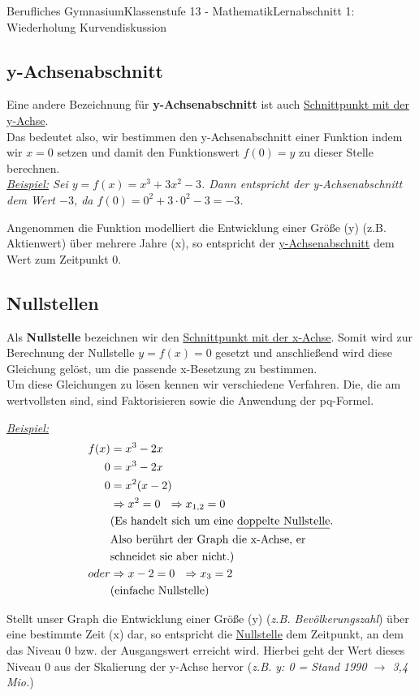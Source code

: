 \documentclass[11pt,twocolumn,oneside,openany,headings=optiontotoc,11pt,numbers=noenddot]{article}
\begin{document}
\begin{worksheet}{Berufliches Gymnasium}{Klassenstufe 13 - Mathematik}{Lernabschnitt 1: Wiederholung Kurvendiskussion}
		\subsection{y-Achsenabschnitt}
		Eine andere Bezeichnung für \textbf{y-Achsenabschnitt} ist auch \underline{Schnittpunkt mit der y-Achse}.\\
		Das bedeutet also, wir bestimmen den y-Achsenabschnitt einer Funktion indem wir \(x=0\) setzen und damit den Funktionswert \(f(0) = y\) zu dieser Stelle berechnen.\\
		\textit{\underline{Beispiel:} Sei \(y = f(x) = x^3 +3x^2 -3\). Dann entspricht der y-Achsenabschnitt dem Wert \(-3\), da \(f(0) = 0^2 +3\cdot{}0^2 -3 = -3\).}
		\begin{framed}
			\noindent
			Angenommen die Funktion modelliert die Entwicklung einer Größe (y) (z.B. Aktienwert) über mehrere Jahre (x), so entspricht der \underline{y-Achsenabschnitt} dem Wert zum Zeitpunkt 0.
		\end{framed}
		\subsection{Nullstellen}
		\label{nst}
		Als \textbf{Nullstelle} bezeichnen wir den \underline{Schnittpunkt mit der x-Achse}. Somit wird zur Berechnung der Nullstelle \(y = f(x) = 0\) gesetzt und anschließend wird diese Gleichung gelöst, um die passende x-Besetzung zu bestimmen.\\
		Um diese Gleichungen zu lösen kennen wir verschiedene Verfahren. Die, die am wertvollsten sind, sind \glqq{}Faktorisieren\grqq{} sowie die Anwendung der \glqq{}pq-Formel\grqq{}.\\
		\par\noindent
		\textit{\underline{Beispiel:}}
		\begin{align*}
			f(x) & = x^3-2x\\
			0 & = x^3 -2x\\
			0 & = x^2(x-2)\\
			& \Rightarrow x^2 = 0\ \ \Rightarrow x_{1,2} = 0\\
			& \text{(Es handelt sich um eine \underline{doppelte Nullstelle}.}\\ & \text{Also berührt der Graph die x-Achse, er}\\
			& \text{schneidet sie aber nicht.)}\\
			oder & \Rightarrow x-2 = 0\ \ \Rightarrow x_3 = 2\\
			& \text{(einfache Nullstelle)}
		\end{align*}
		\begin{framed}
			\noindent
			Stellt unser Graph die Entwicklung einer Größe (y) (\textit{z.B. Bevölkerungszahl}) über eine bestimmte Zeit (x) dar, so entspricht die \underline{Nullstelle} dem Zeitpunkt, an dem das \glqq{}Niveau 0\grqq{} bzw. der Ausgangswert erreicht wird. Hierbei geht der Wert dieses \glqq{}Niveau 0\grqq{} aus der Skalierung der y-Achse hervor (\textit{z.B. y: 0 = Stand 1990 \(\rightarrow\) 3,4 Mio.})
		\end{framed}
		\par\noindent

\end{worksheet}
\end{document}
